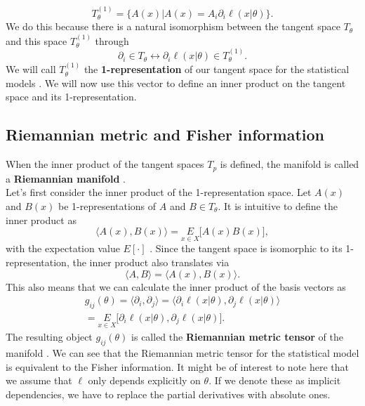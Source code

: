 \begin{equation}
	T_\theta^{(1)} = \{A(x) | A(x) = A_i \partial_i \ell(x|\theta)\}.
\end{equation}
We do this because there is a natural isomorphism between the tangent space $T_\theta$ and this space $T_\theta^{(1)}$ through \cite{AmarisLectureNotes}
\begin{equation}
	\partial_i \in T_\theta \leftrightarrow \partial_i \ell(x|\theta) \in T_\theta^{(1)}.
\end{equation}
We will call $T_\theta^{(1)}$ the \textbf{1-representation} of our tangent space for the statistical models \cite{AmarisLectureNotes}. We will now use this vector to define an inner product on the tangent space and its 1-representation.
\subsection{Riemannian metric and Fisher information}\label{sec:RiemannianMetricAndFI}
When the inner product of the tangent spaces $T_p$ is defined, the manifold is called a \textbf{Riemannian manifold} \cite{AmarisLectureNotes}.\\
Let's first consider the inner product of the 1-representation space. Let $A(x)$ and $B(x)$ be 1-representations of $A$ and $B \in T_\theta$. It is intuitive to define the inner product as 
\begin{equation}
	\langle A(x), B(x) \rangle = \underset{x\in X}{E} \Big[A(x) B(x)\Big],
\end{equation}
with the expectation value $E[\cdot]$ \cite{AmarisLectureNotes}. Since the tangent space is isomorphic to its 1-representation, the inner product also translates via 
\begin{equation}
	\langle A, B \rangle = \langle A(x),B(x) \rangle.
\end{equation}
This also means that we can calculate the inner product of the basis vectors as \cite{AmarisLectureNotes}
\begin{equation}
	\begin{split}
		g_{ij}(\theta) = \langle \partial_i, \partial_j\rangle = \langle \partial_i\ell(x|\theta), \partial_j\ell(x|\theta)\rangle \\
		= \underset{x \in X}{E} \Big[\partial_i\ell(x|\theta), \partial_j\ell(x|\theta)\Big].
	\end{split}
\end{equation}
The resulting object $g_{ij}(\theta)$ is called the \textbf{Riemannian metric tensor} of the manifold \cite{AmarisLectureNotes}. We can see that the Riemannian metric tensor for the statistical model is equivalent to the Fisher information. It might be of interest to note here that we assume that $\ell$ only depends explicitly on $\theta$. If we denote these as implicit dependencies, we have to replace the partial derivatives with absolute ones.\\
